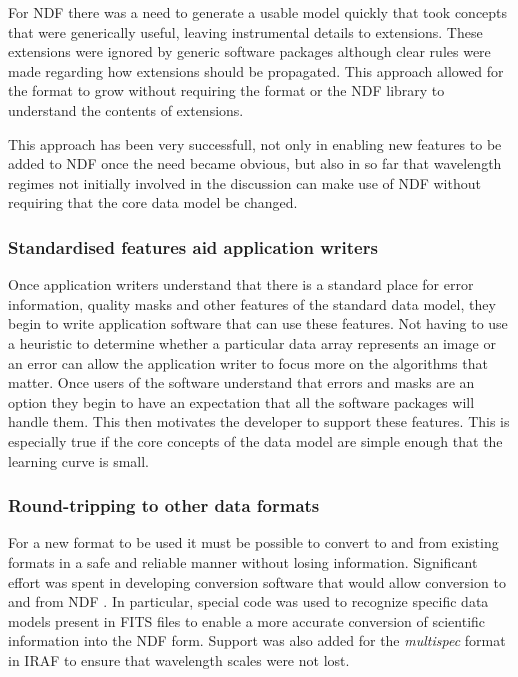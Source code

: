 \documentclass[final,authoryear,5p,times,twocolumn]{elsarticle}
\begin{document}
For NDF there was a need to generate a usable model quickly that took
concepts that were generically useful, leaving instrumental details to
extensions. These extensions were ignored by generic software packages
although clear rules were made regarding how extensions should be
propagated. This approach allowed for the format to grow without
requiring the format or the NDF library to understand the
contents of extensions.

This approach has been very successfull, not only in enabling new
features to be added to NDF once the need became obvious, but also
in so far that wavelength regimes not initially involved in the
discussion can make use of NDF without requiring that the core data
model be changed.

\subsubsection{Standardised features aid application writers}

Once application writers understand that there is a standard place for
error information, quality masks and other features of the standard
data model, they begin to write application software that can use
these features. Not having to use a heuristic to determine whether a
particular data array represents an image or an error can allow the
application writer to focus more on the algorithms that matter. Once
users of the software understand that errors and masks are an option
they begin to have an expectation that all the software packages will
handle them. This then motivates the developer to support these
features.  This is especially true if the core concepts of the data
model are simple enough that the learning curve is small.

\subsubsection{Round-tripping to other data formats}

For a new format to be used it must be possible to
convert to and from existing formats in a safe and reliable manner
without losing information.
Significant effort was spent in developing conversion software that
would allow conversion to and from NDF
\citep{SUN55,1997STARB..19...14C}. In particular, special code was
used to recognize specific data models present in FITS files to enable
a more accurate conversion of scientific information into the NDF
form. Support was also added for the \emph{multispec} format in IRAF
\citep{1993ASPC...52..467V} to ensure that wavelength scales were not
lost.
\end{document}
